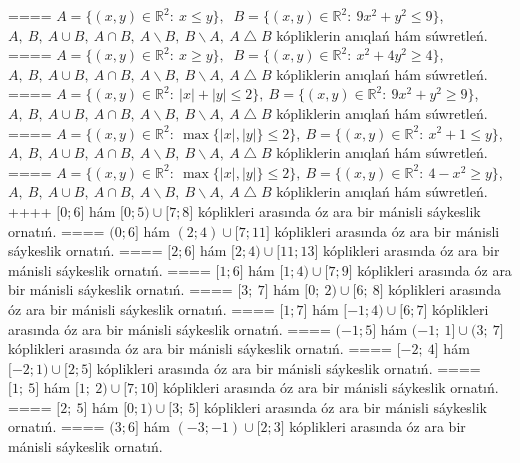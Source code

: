 ====
\(A = \{(x,y) \in \mathbb{R}^{2}:\ x \leq y\},\) \(\ B = \{(x,y) \in \mathbb{R}^{2}:\ 9x^{2} + y^{2} \leq 9\}\), \(A,\ B,\ A \cup B,\ A \cap B,\ A \backslash B,\ B \backslash A,\ A \bigtriangleup B\) kópliklerin anıqlań hám súwretleń.
====
\(A = \{(x,y) \in \mathbb{R}^{2}:\ x \geq y\},\) \(\ B = \{(x,y) \in \mathbb{R}^{2}:\ x^{2} + 4y^{2} \geq 4\}\), \(A,\ B,\ A \cup B,\ A \cap B,\ A \backslash B,\ B \backslash A,\ A \bigtriangleup B\) kópliklerin anıqlań hám súwretleń.
====
\(A = \{(x,y) \in \mathbb{R}^{2}:\ |x| + |y| \leq 2\},\ B = \{(x,y) \in \mathbb{R}^{2}:\ 9x^{2} + y^{2} \geq 9\}\),\(A,\ B,\ A \cup B,\ A \cap B,\ A \backslash B,\ B \backslash A,\ A \bigtriangleup B\) kópliklerin anıqlań hám súwretleń.
====
\(A = \{(x,y) \in \mathbb{R}^{2}:\ \max \{|x|,|y|\} \leq 2\},\ B = \{(x,y) \in \mathbb{R}^{2}:\ x^{2} + 1 \leq y\}\), \(A,\ B,\ A \cup B,\ A \cap B,\ A \backslash B,\ B \backslash A,\ A \bigtriangleup B\) kópliklerin anıqlań hám súwretleń.
====
\(A = \{(x,y) \in \mathbb{R}^{2}:\ \max \{|x|,|y|\} \leq 2\},\ B = \{(x,y) \in \mathbb{R}^{2}:\ 4 - x^{2} \geq y\}\), \(A,\ B,\ A \cup B,\ A \cap B,\ A \backslash B,\ B \backslash A,\ A \bigtriangleup B\) kópliklerin anıqlań hám súwretleń.
++++
\(\lbrack 0;6\rbrack\) hám \(\lbrack 0;5) \cup \lbrack 7;8\rbrack\) kóplikleri arasında óz ara bir mánisli sáykeslik ornatıń.
====
\((0;6\rbrack\) hám \((2;4) \cup \lbrack 7;11\rbrack\) kóplikleri arasında óz ara bir mánisli sáykeslik ornatıń.
====
\(\lbrack 2;6\rbrack\) hám \(\lbrack 2;4) \cup \lbrack 11;13\rbrack\) kóplikleri arasında óz ara bir mánisli sáykeslik ornatıń.
====
\(\lbrack 1;6\rbrack\) hám \(\lbrack 1;4) \cup \lbrack 7;9\rbrack\) kóplikleri arasında óz ara bir mánisli sáykeslik ornatıń.
====
\(\lbrack 3;\ 7\rbrack\) hám \(\lbrack 0;\ 2) \cup \lbrack 6;\ 8\rbrack\) kóplikleri arasında óz ara bir mánisli sáykeslik ornatıń.
====
\(\lbrack 1;7\rbrack\) hám \(\lbrack - 1;4) \cup \lbrack 6;7\rbrack\) kóplikleri arasında óz ara bir mánisli sáykeslik ornatıń.
====
\(( - 1;5\rbrack\) hám \(( - 1;\ 1\rbrack \cup (3;\ 7\rbrack\) kóplikleri arasında óz ara bir mánisli sáykeslik ornatıń.
====
\(\lbrack - 2;\ 4\rbrack\) hám \(\lbrack - 2;1) \cup \lbrack 2;5\rbrack\) kóplikleri arasında óz ara bir mánisli sáykeslik ornatıń.
====
\(\lbrack 1;\ 5\rbrack\) hám \(\lbrack 1;\ 2) \cup \lbrack 7;10\rbrack\) kóplikleri arasında óz ara bir mánisli sáykeslik ornatıń.
====
\(\lbrack 2;\ 5\rbrack\) hám \(\lbrack 0;1) \cup \lbrack 3;\ 5\rbrack\) kóplikleri arasında óz ara bir mánisli sáykeslik ornatıń.
====
\((3;6\rbrack\) hám \(( - 3; - 1) \cup \lbrack 2;3\rbrack\) kóplikleri arasında óz ara bir mánisli sáykeslik ornatıń.
